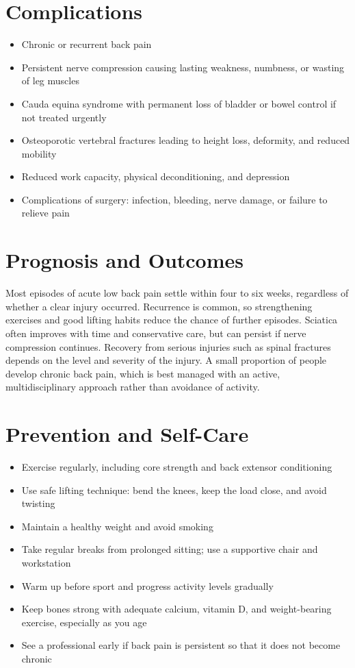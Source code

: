 \section*{Complications}
\begin{itemize}
    \item Chronic or recurrent back pain
    \item Persistent nerve compression causing lasting weakness, numbness, or wasting of leg muscles
    \item Cauda equina syndrome with permanent loss of bladder or bowel control if not treated urgently
    \item Osteoporotic vertebral fractures leading to height loss, deformity, and reduced mobility
    \item Reduced work capacity, physical deconditioning, and depression
    \item Complications of surgery: infection, bleeding, nerve damage, or failure to relieve pain
\end{itemize}

\section*{Prognosis and Outcomes}
Most episodes of acute low back pain settle within four to six weeks, regardless of whether a clear injury occurred. Recurrence is common, so strengthening exercises and good lifting habits reduce the chance of further episodes. Sciatica often improves with time and conservative care, but can persist if nerve compression continues. Recovery from serious injuries such as spinal fractures depends on the level and severity of the injury. A small proportion of people develop chronic back pain, which is best managed with an active, multidisciplinary approach rather than avoidance of activity.

\section*{Prevention and Self-Care}
\begin{itemize}
    \item Exercise regularly, including core strength and back extensor conditioning
    \item Use safe lifting technique: bend the knees, keep the load close, and avoid twisting
    \item Maintain a healthy weight and avoid smoking
    \item Take regular breaks from prolonged sitting; use a supportive chair and workstation
    \item Warm up before sport and progress activity levels gradually
    \item Keep bones strong with adequate calcium, vitamin D, and weight-bearing exercise, especially as you age
    \item See a professional early if back pain is persistent so that it does not become chronic
\end{itemize}

